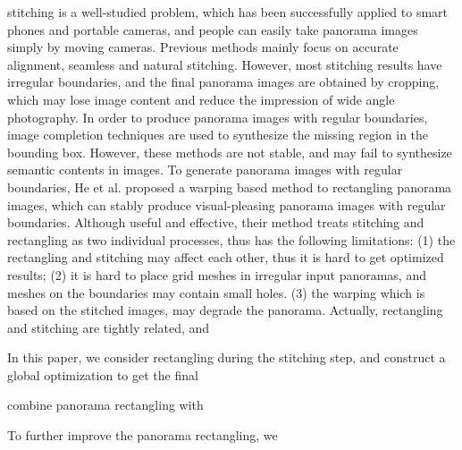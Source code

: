 \documentclass[10pt,journal,compsoc]{IEEEtran}
\begin{document}
\maketitle


\IEEEdisplaynontitleabstractindextext

\IEEEpeerreviewmaketitle



 stitching is a well-studied problem, which has been successfully applied to smart phones and portable cameras, and people can easily take panorama images simply by moving cameras. Previous methods \cite{journals/ftcgv/Szeliski06,journals/pami/ZaragozaCTBS14,conf/eccv/ChenC16}mainly focus on accurate alignment, seamless and natural stitching.
However, most stitching results have irregular boundaries, and the final panorama images are obtained by cropping, which may lose image content and reduce the impression of wide angle photography. In order to produce panorama images with regular boundaries, image completion techniques\cite{journals/mta/YenYC17,journals/tog/BarnesSFG09} are used to synthesize the missing region in the bounding box. However, these methods are not stable, and may fail to synthesize semantic contents in images.
To generate panorama images with regular boundaries, He et al. \cite{journals/tog/HeC013} proposed a warping based method to rectangling panorama images, which can stably produce visual-pleasing panorama images with regular boundaries. Although useful and effective, their method treats stitching and rectangling as two individual processes, thus has the following limitations: (1) the rectangling and stitching may affect each other, thus it is hard to get optimized results; (2) it is hard to place grid meshes in irregular input panoramas, and meshes on the boundaries may contain small holes. (3) the warping which is based on the stitched images, may degrade the panorama.
Actually, rectangling and stitching are tightly related, and 


In this paper, we consider rectangling during the stitching step, and construct a global optimization to get the final



combine panorama rectangling with


To further improve the panorama rectangling, we
\end{document}
